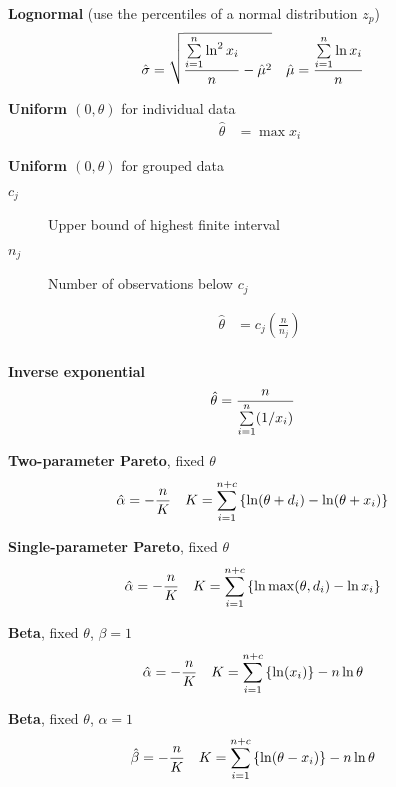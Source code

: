 \documentclass[10pt, french]{article}
\begin{document}
\begin{multicols*}{2}
\textbf{Lognormal} (use the percentiles of a normal distribution $z_{p}$)
\begin{align*}
	\hat{\sigma}
	&=	\sqrt{\frac{\overset{n}{\underset{i = 1}{\sum}}\ln^{2} x_{i}}{n} - \hat{\mu}^{2}}	&
	\hat{\mu}
	&=	\frac{\overset{n}{\underset{i = 1}{\sum}}\ln x_{i}}{n}
\end{align*}

\textbf{Uniform $(0, \theta)$} for individual data
\begin{align*}
	\hat{\theta}
	&=	\max x_{i}
\end{align*}

\textbf{Uniform $(0, \theta)$} for grouped data
\begin{description}
	\item[$c_{j}$]	Upper bound of highest finite interval
	\item[$n_{j}$]	Number of observations below $c_{j}$
\end{description}
\begin{align*}
	\hat{\theta}
	&=	c_{j} \left(\frac{n}{n_{j}}\right)	\\
\end{align*}

\textbf{Inverse exponential}
\begin{align*}
	\hat{\theta}
	&=	\frac{n}{\overset{n}{\underset{i = 1}{\sum}}(1/x_{i})}
\end{align*}

\textbf{Two-parameter Pareto}, fixed $\theta$
\begin{align*}
	\hat{\alpha}
	&=	-\frac{n}{K}	&
	K
	&=	\overset{n + c}{\underset{i	=	1}{\sum}} \left\{\ln (\theta +  d_{i})	-	\ln (\theta + x_{i})\right\}
\end{align*}

\textbf{Single-parameter Pareto}, fixed $\theta$
\begin{align*}
	\hat{\alpha}
	&=	-\frac{n}{K}	&
	K
	&=	\overset{n + c}{\underset{i	=	1}{\sum}} \left\{\ln \max(\theta, d_{i})	-	\ln x_{i}\right\}
\end{align*}

\textbf{Beta}, fixed $\theta$, $\beta	=	1$
\begin{align*}
	\hat{\alpha}
	&=	-\frac{n}{K}	&
	K
	&=	\overset{n + c}{\underset{i	=	1}{\sum}} \left\{\ln (x_{i})\right\}	-	n\ln \theta
\end{align*}

\textbf{Beta}, fixed $\theta$, $\alpha	=	1$
\begin{align*}
	\hat{\beta}
	&=	-\frac{n}{K}	&
	K
	&=	\overset{n + c}{\underset{i	=	1}{\sum}} \left\{\ln (\theta - x_{i})\right\}	-	n\ln \theta
\end{align*}


\end{multicols*}
\end{document}
